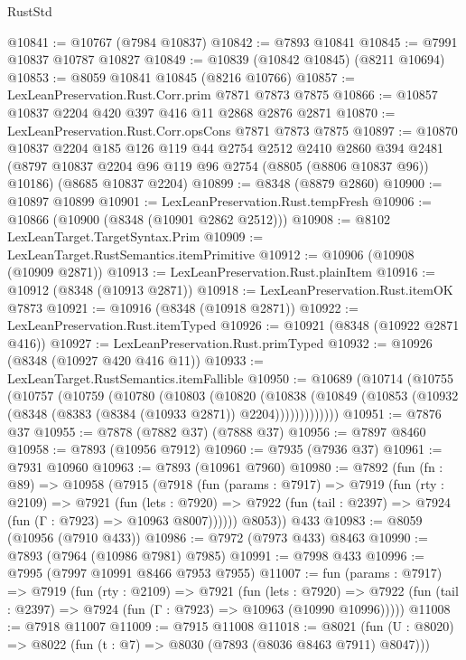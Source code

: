 \begin{lexlean}{RustStd}
\begin{coremodule}
@10841 := @10767 (@7984 @10837)
@10842 := @7893 @10841
@10845 := @7991 @10837 @10787 @10827
@10849 := @10839 (@10842 @10845) (@8211 @10694)
@10853 := @8059 @10841 @10845 (@8216 @10766)
@10857 := LexLeanPreservation.Rust.Corr.prim @7871 @7873 @7875
@10866 := @10857 @10837 @2204 @420 @397 @416 @11 @2868 @2876 @2871
@10870 := LexLeanPreservation.Rust.Corr.opsCons @7871 @7873 @7875
@10897 := @10870
    @10837
    @2204
    @185
    @126
    @119
    @44
    @2754
    @2512
    @2410
    @2860
    @394
    @2481
    (@8797 @10837 @2204 @96 @119 @96 @2754 (@8805 (@8806 @10837 @96)) @10186)
    (@8685 @10837 @2204)
@10899 := @8348 (@8879 @2860)
@10900 := @10897 @10899
@10901 := LexLeanPreservation.Rust.tempFresh
@10906 := @10866 (@10900 (@8348 (@10901 @2862 @2512)))
@10908 := @8102 LexLeanTarget.TargetSyntax.Prim
@10909 := LexLeanTarget.RustSemantics.itemPrimitive
@10912 := @10906 (@10908 (@10909 @2871))
@10913 := LexLeanPreservation.Rust.plainItem
@10916 := @10912 (@8348 (@10913 @2871))
@10918 := LexLeanPreservation.Rust.itemOK @7873
@10921 := @10916 (@8348 (@10918 @2871))
@10922 := LexLeanPreservation.Rust.itemTyped
@10926 := @10921 (@8348 (@10922 @2871 @416))
@10927 := LexLeanPreservation.Rust.primTyped
@10932 := @10926 (@8348 (@10927 @420 @416 @11))
@10933 := LexLeanTarget.RustSemantics.itemFallible
@10950 := @10689
    (@10714
      (@10755
        (@10757
          (@10759
            (@10780
              (@10803
                (@10820
                  (@10838
                    (@10849 (@10853 (@10932 (@8348 (@8383 (@8384 (@10933 @2871)) @2204)))))))))))))
@10951 := @7876 @37
@10955 := @7878 (@7882 @37) (@7888 @37)
@10956 := @7897 @8460
@10958 := @7893 (@10956 @7912)
@10960 := @7935 (@7936 @37)
@10961 := @7931 @10960
@10963 := @7893 (@10961 @7960)
@10980 := @7892
    (fun (fn : @89) =>
    @10958
      (@7915
        (@7918
          (fun (params : @7917) =>
          @7919
            (fun (rty : @2109) =>
            @7921
              (fun (lets : @7920) =>
              @7922 (fun (tail : @2397) => @7924 (fun (Γ : @7923) => @10963 @8007))))))
        @8053))
    @433
@10983 := @8059 (@10956 (@7910 @433))
@10986 := @7972 (@7973 @433) @8463
@10990 := @7893 (@7964 (@10986 @7981) @7985)
@10991 := @7998 @433
@10996 := @7995 (@7997 @10991 @8466 @7953 @7955)
@11007 := fun (params : @7917) =>
  @7919
    (fun (rty : @2109) =>
    @7921
      (fun (lets : @7920) =>
      @7922 (fun (tail : @2397) => @7924 (fun (Γ : @7923) => @10963 (@10990 @10996)))))
@11008 := @7918 @11007
@11009 := @7915 @11008
@11018 := @8021 (fun (U : @8020) => @8022 (fun (t : @7) => @8030 (@7893 (@8036 @8463 @7911) @8047)))

\end{coremodule}
\end{lexlean}
